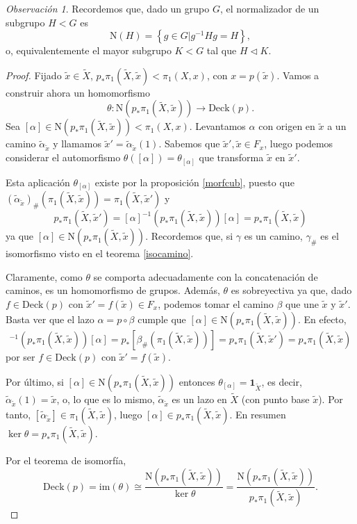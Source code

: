 \documentclass[12pt,a4paper]{book}
\theoremstyle{definition} \newtheorem{defn}[thm]{Definición}
\theoremstyle{definition} \newtheorem{ejemplo}[thm]{Ejemplo}
\theoremstyle{definition} \newtheorem{ejercicio}[thm]{Ejercicio}
\theoremstyle{remark} \newtheorem*{obs}{Observación}
\def\id{\mathbf{1}}
\def\gf{\pi_1}
\def\XX{\tilde{X}}
\def\xx{\tilde{x}}
\def\im{\mathrm{im}}
\def\DD{\mathrm{Deck}}
\def\NR{\mathrm{N}}
\begin{document}
\begin{obs}
  Recordemos que, dado un grupo $G$, el normalizador de un subgrupo $H<G$ es 
  \begin{equation*}
    \NR(H)=\left\{ g\in G| g^{-1}Hg=H \right\},
  \end{equation*}
  o, equivalentemente el mayor subgrupo $K<G$ tal que $H\lhd K$.
\end{obs}
\begin{proof}
  Fijado $\xx\in \XX$, $p_*\gf(\XX,\xx)<\gf(X,x)$, con $x=p(\xx)$. Vamos a construir ahora un homomorfismo
  \begin{equation*}
    \theta:\NR(p_{*}\gf(\XX,\xx))\rightarrow \DD(p).
  \end{equation*}
  Sea $[\alpha]\in \NR(p_*\gf(\XX,\xx))<\gf(X,x)$. Levantamos $\alpha$ con origen en $\xx$ a un camino $\tilde{\alpha}_{\xx}$ y llamamos $\xx'=\tilde{\alpha}_{\xx}(1)$. Sabemos que $\xx',\xx \in F_x$, luego podemos considerar el automorfismo $\theta([\alpha])=\theta_{[\alpha]}$ que transforma $\xx$ en $\xx'$.

  Esta aplicación $\theta_{[\alpha]}$ existe por la proposición \ref{morfcub}, puesto que $(\tilde{\alpha}_{\xx})_{\#}(\gf(\XX,\xx))=\gf(\XX,\xx')$ y 
  \begin{equation*}
    p_*\gf(\XX,\xx')=[\alpha]^{-1}(p_*\gf(\XX,\xx))[\alpha]=p_*\gf(\XX,\xx)
  \end{equation*}
  ya que $[\alpha]\in \NR(p_*\gf(\XX,\xx))$. Recordemos que, si $\gamma$ es un camino, $\gamma_\#$ es el isomorfismo visto en el teorema \ref{isocamino}.

  Claramente, como $\theta$ se comporta adecuadamente con la concatenación de caminos, es un homomorfismo de grupos. Además, $\theta$ es sobreyectiva ya que, dado $f\in \DD(p)$ con $\xx'=f(\xx)\in F_x$, podemos tomar el camino $\beta$ que une $\xx$ y $\xx'$. Basta ver que el lazo $\alpha=p\circ \beta$ cumple que $[\alpha]\in \NR(p_*\gf(\XX,\xx))$. En efecto,
  \begin{equation*}
    [\alpha]^{-1}(p_*\gf(\XX,\xx))[\alpha]=p_*[\beta_{\#}(\gf(\XX,\xx))]=p_*\gf(\XX,\xx')=p_*\gf(\XX,\xx)
  \end{equation*}
  por ser $f\in \DD(p)$ con $\xx'=f(\xx)$.

  Por último, si $[\alpha]\in \NR(p_*\gf(\XX,\xx))$ entonces $\theta_{[\alpha]}=\id_{\XX}$, es decir, $\tilde{\alpha}_{\xx}(1)=\xx$, o, lo que es lo mismo, $\tilde{\alpha}_{\xx}$ es un lazo en $\XX$ (con punto base $\xx$). Por tanto, $[\tilde{\alpha}_{\xx}]\in \gf(\XX,\xx)$, luego $[\alpha]\in p_*\gf(\XX,\xx)$. En resumen $\ker\theta=p_*\gf(\XX,\xx)$. 

  Por el teorema de isomorfía,
  \begin{equation*}
    \DD(p)=\im(\theta)\cong \frac{\NR(p_*\gf(\XX,\xx))}{\ker\theta}=\frac{\NR(p_*\gf(\XX,\xx))}{p_*\gf(\XX,\xx)}.
  \end{equation*}
\end{proof}
\end{document}
